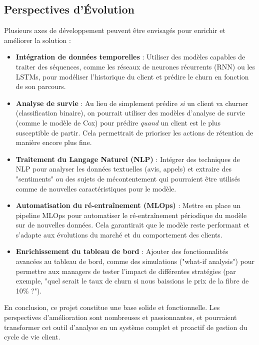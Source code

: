 \subsection{Perspectives d'Évolution}
Plusieurs axes de développement peuvent être envisagés pour enrichir et améliorer la solution :
\begin{itemize}
    \item \textbf{Intégration de données temporelles} : Utiliser des modèles capables de traiter des séquences, comme les réseaux de neurones récurrents (RNN) ou les LSTMs, pour modéliser l'historique du client et prédire le churn en fonction de son parcours.
    \item \textbf{Analyse de survie} : Au lieu de simplement prédire \textit{si} un client va churner (classification binaire), on pourrait utiliser des modèles d'analyse de survie (comme le modèle de Cox) pour prédire \textit{quand} un client est le plus susceptible de partir. Cela permettrait de prioriser les actions de rétention de manière encore plus fine.
    \item \textbf{Traitement du Langage Naturel (NLP)} : Intégrer des techniques de NLP pour analyser les données textuelles (avis, appels) et extraire des "sentiments" ou des sujets de mécontentement qui pourraient être utilisés comme de nouvelles caractéristiques pour le modèle.
    \item \textbf{Automatisation du ré-entraînement (MLOps)} : Mettre en place un pipeline MLOps pour automatiser le ré-entraînement périodique du modèle sur de nouvelles données. Cela garantirait que le modèle reste performant et s'adapte aux évolutions du marché et du comportement des clients.
    \item \textbf{Enrichissement du tableau de bord} : Ajouter des fonctionnalités avancées au tableau de bord, comme des simulations ("what-if analysis") pour permettre aux managers de tester l'impact de différentes stratégies (par exemple, "quel serait le taux de churn si nous baissions le prix de la fibre de 10\% ?").
\end{itemize}

En conclusion, ce projet constitue une base solide et fonctionnelle. Les perspectives d'amélioration sont nombreuses et passionnantes, et pourraient transformer cet outil d'analyse en un système complet et proactif de gestion du cycle de vie client.

